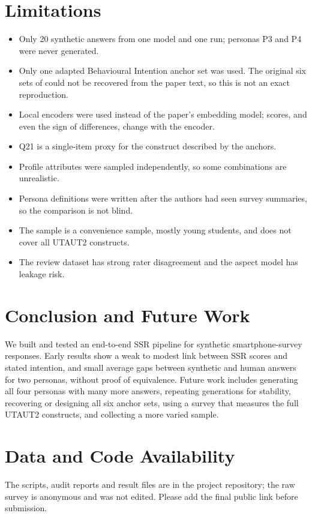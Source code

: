 \documentclass[conference]{IEEEtran}
\begin{document}
\section{Limitations}
\label{sec:limits}
\begin{itemize}
\item Only 20 synthetic answers from one model and one run; personas P3 and P4 were never generated.
\item Only one adapted Behavioural Intention anchor set was used. The original six sets of \cite{maier2025} could not be recovered from the paper text, so this is not an exact reproduction.
\item Local encoders were used instead of the paper's embedding model; scores, and even the sign of differences, change with the encoder.
\item Q21 is a single-item proxy for the construct described by the anchors.
\item Profile attributes were sampled independently, so some combinations are unrealistic.
\item Persona definitions were written after the authors had seen survey summaries, so the comparison is not blind.
\item The sample is a convenience sample, mostly young students, and does not cover all UTAUT2 constructs.
\item The review dataset has strong rater disagreement and the aspect model has leakage risk.
\end{itemize}

\section{Conclusion and Future Work}
We built and tested an end-to-end SSR pipeline for synthetic smartphone-survey responses. Early results show a weak to modest link between SSR scores and stated intention, and small average gaps between synthetic and human answers for two personas, without proof of equivalence. Future work includes generating all four personas with many more answers, repeating generations for stability, recovering or designing all six anchor sets, using a survey that measures the full UTAUT2 constructs, and collecting a more varied sample.

\section*{Data and Code Availability}
The scripts, audit reports and result files are in the project repository; the raw survey is anonymous and was not edited. Please add the final public link before submission.
\end{document}
